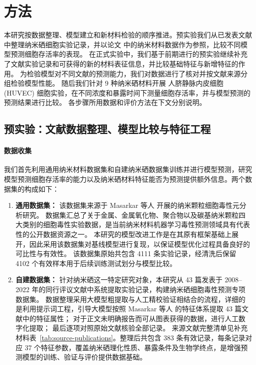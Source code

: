 \section{方法}

本研究按数据整理、模型建立和新材料检验的顺序推进。预实验我们从已发表文献中整理纳米硒细胞实验记录，并以论文 \cite{masarkar2024} 中的纳米材料数据作为参照，比较不同模型预测细胞存活率的表现。
在正式实验中，我们基于前期进行的预实验继续补充了文献实验记录和可获得的新的材料表征信息，并比较基础特征与新增特征的作用。
为检验模型对不同文献的预测能力，我们对数据进行了核对并按文献来源分组检验模型性能。
随后我们针对 9 种纳米硒材料开展 人脐静脉内皮细胞(HUVEC) 细胞实验，在不同浓度和暴露时间下测量细胞存活率，并与模型预测的预测结果进行比较。
各步骤所用数据和评价方法在下文分别说明。

\subsection{预实验：文献数据整理、模型比较与特征工程}

\paragraph{数据收集}
我们首先利用通用纳米材料数据集和自建纳米硒数据集训练并进行模型预测，研究模型预测细胞存活率的能力以及纳米硒材料特征能否为预测提供额外信息。两个数据集的构成如下：
\begin{enumerate}
  \item \textbf{通用数据集：}
该数据集来源于 Masarkar 等人 \cite{masarkar2024} 开展的纳米颗粒细胞毒性元分析研究。
数据集汇总了关于金属、金属氧化物、聚合物以及碳基纳米颗粒四大类别的细胞毒性实验数据，是当前纳米材料机器学习毒性预测领域具有代表性的公开数据资源之一。
本研究的模型改进工作是在其原有框架基础上展开，因此采用该数据集对基线模型进行复现，以保证模型优化过程具备良好的可比性与有效性。
该数据集原始共包含 4111 条实验记录，经清洗后保留 4102 个有效样本用于后续训练测试划分与模型比较。

  \item \textbf{自建数据集：}
针对纳米硒这一特定研究对象，本研究从 43 篇发表于 2008--2022 年的同行评议文献中系统提取实验记录，构建纳米硒细胞毒性预测专项数据集。
数据整理采用大模型粗提取与人工精校验证相结合的流程，详细的是利用提示词工程，引导大模型按照 Masarkar 等人\cite{masarkar2024} 的特征体系提取 43 篇文献中的特征属性；
对于正文未明确报告而可从图表获得的数据，进行人工数字化提取；
最后逐项对照原始文献核验全部记录。
来源文献完整清单见补充材料表~\ref{tab:source-publications}。整理后共包含 383 条有效记录，每条记录对应 37 个特征参数，覆盖纳米硒理化性质、暴露条件及生物学终点，是增强预测模型的训练、验证与评价提供数据基础。
\end{enumerate}

